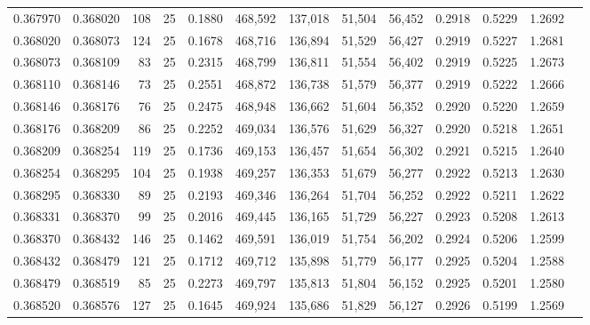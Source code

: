 \begin{tabular}{rrrrrrrrrrrrr}
0.367970 & 0.368020 &   108 &  25 &                                     0.1880 & 468,592 & 137,018 &  51,504 &  56,452 & 0.2918 & 0.5229 & 1.2692 \\
0.368020 & 0.368073 &   124 &  25 &                                     0.1678 & 468,716 & 136,894 &  51,529 &  56,427 & 0.2919 & 0.5227 & 1.2681 \\
0.368073 & 0.368109 &    83 &  25 &                                     0.2315 & 468,799 & 136,811 &  51,554 &  56,402 & 0.2919 & 0.5225 & 1.2673 \\
0.368110 & 0.368146 &    73 &  25 &                                     0.2551 & 468,872 & 136,738 &  51,579 &  56,377 & 0.2919 & 0.5222 & 1.2666 \\
0.368146 & 0.368176 &    76 &  25 &                                     0.2475 & 468,948 & 136,662 &  51,604 &  56,352 & 0.2920 & 0.5220 & 1.2659 \\
0.368176 & 0.368209 &    86 &  25 &                                     0.2252 & 469,034 & 136,576 &  51,629 &  56,327 & 0.2920 & 0.5218 & 1.2651 \\
0.368209 & 0.368254 &   119 &  25 &                                     0.1736 & 469,153 & 136,457 &  51,654 &  56,302 & 0.2921 & 0.5215 & 1.2640 \\
0.368254 & 0.368295 &   104 &  25 &                                     0.1938 & 469,257 & 136,353 &  51,679 &  56,277 & 0.2922 & 0.5213 & 1.2630 \\
0.368295 & 0.368330 &    89 &  25 &                                     0.2193 & 469,346 & 136,264 &  51,704 &  56,252 & 0.2922 & 0.5211 & 1.2622 \\
0.368331 & 0.368370 &    99 &  25 &                                     0.2016 & 469,445 & 136,165 &  51,729 &  56,227 & 0.2923 & 0.5208 & 1.2613 \\
0.368370 & 0.368432 &   146 &  25 &                                     0.1462 & 469,591 & 136,019 &  51,754 &  56,202 & 0.2924 & 0.5206 & 1.2599 \\
0.368432 & 0.368479 &   121 &  25 &                                     0.1712 & 469,712 & 135,898 &  51,779 &  56,177 & 0.2925 & 0.5204 & 1.2588 \\
0.368479 & 0.368519 &    85 &  25 &                                     0.2273 & 469,797 & 135,813 &  51,804 &  56,152 & 0.2925 & 0.5201 & 1.2580 \\
0.368520 & 0.368576 &   127 &  25 &                                     0.1645 & 469,924 & 135,686 &  51,829 &  56,127 & 0.2926 & 0.5199 & 1.2569 \\

\end{tabular}
